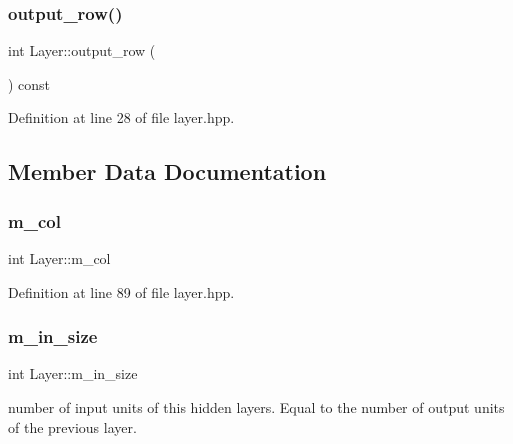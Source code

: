 \mbox{\label{class_layer_a85eaa20f5bcb06e7ade031e4ae7a6a48}} 
\subsubsection{\texorpdfstring{output\+\_\+row()}{output\_row()}}
{\footnotesize\ttfamily int Layer\+::output\+\_\+row (\begin{DoxyParamCaption}{ }\end{DoxyParamCaption}) const}



Definition at line 28 of file layer.\+hpp.



\subsection{Member Data Documentation}
\mbox{\label{class_layer_aca74b8d744936b335e7b6b0b1210a865}} 
\subsubsection{\texorpdfstring{m\+\_\+col}{m\_col}}
{\footnotesize\ttfamily int Layer\+::m\+\_\+col\hspace{0.3cm}{\ttfamily [protected]}}



Definition at line 89 of file layer.\+hpp.

\mbox{\label{class_layer_a81eb09af5acc2c32c92edb735dbb327a}} 
\subsubsection{\texorpdfstring{m\+\_\+in\+\_\+size}{m\_in\_size}}
{\footnotesize\ttfamily int Layer\+::m\+\_\+in\+\_\+size\hspace{0.3cm}{\ttfamily [protected]}}



number of input units of this hidden layers. Equal to the number of output units of the previous layer. 



